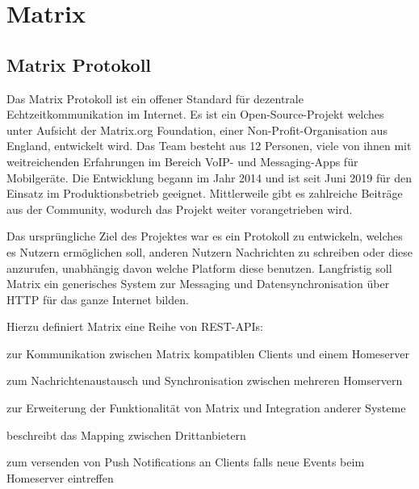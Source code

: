     \newpage
    \section{Matrix}\label{sec:matrix}

    \subsection{Matrix Protokoll}\label{subsec:matrix-protokoll}
    Das Matrix Protokoll ist ein offener Standard für dezentrale Echtzeitkommunikation im Internet.
    Es ist ein Open-Source-Projekt welches unter Aufsicht der Matrix.org Foundation, einer Non-Profit-Organisation aus England, entwickelt wird.
    Das Team besteht aus 12 Personen, viele von ihnen mit weitreichenden Erfahrungen im Bereich VoIP- und Messaging-Apps für Mobilgeräte.
    Die Entwicklung begann im Jahr 2014 und ist seit Juni 2019 für den Einsatz im Produktionsbetrieb geeignet.
    Mittlerweile gibt es zahlreiche Beiträge aus der Community, wodurch das Projekt weiter vorangetrieben wird.
    ~\cite{matrixfaq}

    Das ursprüngliche Ziel des Projektes war es ein Protokoll zu entwickeln, welches es Nutzern ermöglichen soll, anderen Nutzern Nachrichten zu schreiben oder diese anzurufen, unabhängig davon welche Platform diese benutzen.
    Langfristig soll Matrix ein generisches System zur Messaging und Datensynchronisation über HTTP für das ganze Internet bilden.
    ~\cite{matrixfaq}

    Hierzu definiert Matrix eine Reihe von REST-APIs:
    \begin{description}[leftmargin=!,labelwidth=5.5cm]
        \item [Client-Server-API\footnotemark]  zur Kommunikation zwischen Matrix kompatiblen Clients und einem Homeserver
        \item [Server-Server-API\footnotemark]  zum Nachrichtenaustausch und Synchronisation zwischen mehreren Homservern
        \item [Application-Service-API\footnotemark]  zur Erweiterung der Funktionalität von Matrix und Integration anderer Systeme
        \item [Identity-Service-API\footnotemark]  beschreibt das Mapping zwischen Drittanbietern
        \item [Push-Gateway-API\footnotemark]  zum versenden von Push Notifications an Clients falls neue Events beim Homeserver eintreffen
    \end{description}



